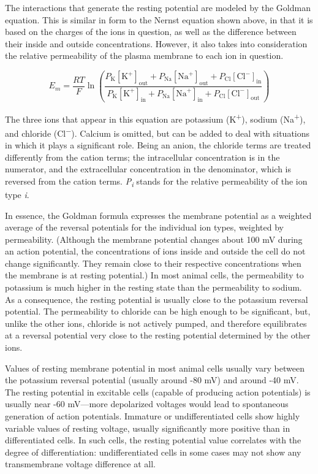 The interactions that generate the resting potential are modeled by the Goldman equation. This is similar in form to the Nernst equation shown above, in that it is based on the charges of the ions in question, as well as the difference between their inside and outside concentrations. However, it also takes into consideration the relative permeability of the plasma membrane to each ion in question.

\[ E_{m} = \frac{RT}{F} \ln{ \left( \frac{ P_{\mathrm{K}}[\mathrm{K}^{+}]_\mathrm{out} + P_{\mathrm{Na}}[\mathrm{Na}^{+}]_\mathrm{out} + P_{\mathrm{Cl}}[\mathrm{Cl}^{-}]_\mathrm{in}}{ P_{\mathrm{K}}[\mathrm{K}^{+}]_\mathrm{in} + P_{\mathrm{Na}}[\mathrm{Na}^{+}]_\mathrm{in} + P_{\mathrm{Cl}}[\mathrm{Cl}^{-}]_\mathrm{out}} \right) } \]

The three ions that appear in this equation are potassium (K\textsuperscript{+}), sodium (Na\textsuperscript{+}), and chloride (Cl\textsuperscript{−}). Calcium is omitted, but can be added to deal with situations in which it plays a significant role. Being an anion, the chloride terms are treated differently from the cation terms; the intracellular concentration is in the numerator, and the extracellular concentration in the denominator, which is reversed from the cation terms. \emph{P\textsubscript{i}} stands for the relative permeability of the ion type \emph{i}.

In essence, the Goldman formula expresses the membrane potential as a weighted average of the reversal potentials for the individual ion types, weighted by permeability. (Although the membrane potential changes about 100 mV during an action potential, the concentrations of ions inside and outside the cell do not change significantly. They remain close to their respective concentrations when the membrane is at resting potential.) In most animal cells, the permeability to potassium is much higher in the resting state than the permeability to sodium. As a consequence, the resting potential is usually close to the potassium reversal potential. The permeability to chloride can be high enough to be significant, but, unlike the other ions, chloride is not actively pumped, and therefore equilibrates at a reversal potential very close to the resting potential determined by the other ions.

Values of resting membrane potential in most animal cells usually vary between the potassium reversal potential (usually around -80 mV) and around -40 mV. The resting potential in excitable cells (capable of producing action potentials) is usually near -60 mV---more depolarized voltages would lead to spontaneous generation of action potentials. Immature or undifferentiated cells show highly variable values of resting voltage, usually significantly more positive than in differentiated cells. In such cells, the resting potential value correlates with the degree of differentiation: undifferentiated cells in some cases may not show any transmembrane voltage difference at all.

